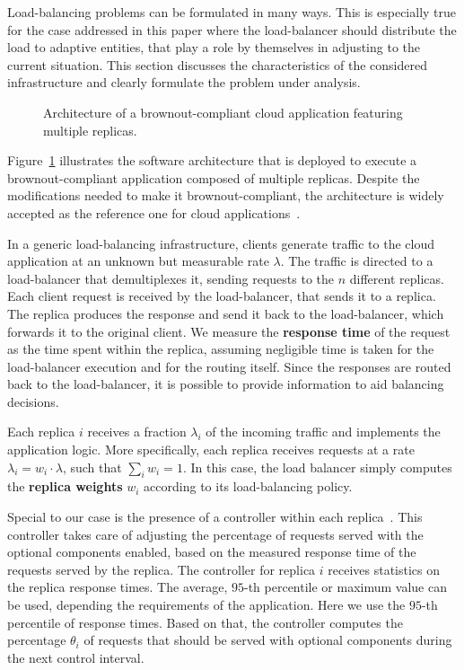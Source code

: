 Load-balancing problems can be formulated in many ways. This is
especially true for the case addressed in this paper where the
load-balancer should distribute the load to adaptive entities, that
play a role by themselves in adjusting to the current situation. This
section discusses the characteristics of the considered infrastructure
and clearly formulate the problem under analysis.

\begin{figure}[t]
  \centering 
   
  \caption{Architecture of a brownout-compliant cloud application
    featuring multiple replicas.}
    \vspace{-6mm}
  \label{fig:architecture}
\end{figure}

Figure~\ref{fig:architecture} illustrates the software architecture
that is deployed to execute a brownout-compliant application composed
of multiple replicas. Despite the modifications needed to make it
brownout-compliant, the architecture is widely accepted as the
reference one for cloud applications~\citep{Barroso09}.

In a generic load-balancing infrastructure, clients generate traffic
to the cloud application at an unknown but measurable rate
$\lambda$. The traffic is directed to a load-balancer that
demultiplexes it, sending requests to the $n$ different replicas. Each
client request is received by the load-balancer, that sends it to a
replica. The replica produces the response and send it back to the
load-balancer, which forwards it to the original client. We measure
the \textbf{response time} of the request as the time spent within the
replica, assuming negligible time is taken for the load-balancer
execution and for the routing itself. Since the responses are routed
back to the load-balancer, it is possible to provide information to
aid balancing decisions.

Each replica $i$ receives a fraction $\lambda_i$ of the incoming
traffic and implements the application logic. More specifically, each
replica receives requests at a rate $\lambda_i = w_i \cdot \lambda$,
such that $\sum_{i} w_i = 1$. In this case, the load balancer simply
computes the \textbf{replica weights} $w_i$ according to its
load-balancing policy.

Special to our case is the presence of a controller within each
replica~\cite{cloudish-tr}. This controller takes care of adjusting
the percentage of requests served with the optional components
enabled, based on the measured response time of the requests served by
the replica. The controller for replica $i$ receives statistics on the
replica response times. The average, $95$-th percentile or maximum
value can be used, depending the requirements of the application.
Here we use the $95$-th percentile of response times. Based on that,
the controller computes the percentage $\theta_i$ of requests that
should be served with optional components during the next control
interval.

